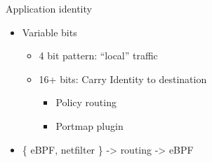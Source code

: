 \documentclass[black,white,aspectratio=169]{beamer}
\DeclareRobustCommand{\#}{\adjustbox{valign=B,totalheight=.57\baselineskip}{\oldhash}}%
\begin{document}
    \begin{frame}{Application identity}
        \begin{table}
            \begin{subtable}[l]{0.7\textwidth}
        \begin{itemize}
            \item Variable bits~\smallskip
            \begin{itemize}
                \item 4 bit pattern: ``local'' traffic~\smallskip
                \item 16+ bits: Carry Identity to destination~\smallskip
                \begin{itemize}
                    \item Policy routing~\smallskip
                    \item Portmap plugin~\medskip
                \end{itemize}
            \end{itemize}
            \item \{ eBPF, netfilter \} -> routing -> eBPF~\medskip
        \end{itemize}
            \end{subtable}
            \begin{subtable}[r]{0.2\textwidth}

\end{subtable}
\end{table}
\end{frame}
\end{document}
